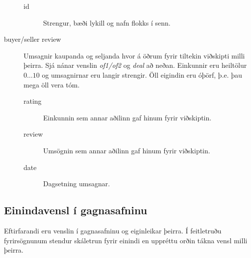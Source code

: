 \documentclass[a4paper,icelandic]{article}
\theoremstyle{definition} \newtheorem{skilgr}{Skilgreining}
\theoremstyle{plain}      \newtheorem{setn}{Setning}
\theoremstyle{remark}     \newtheorem*{lausn}{Lausn}
\begin{document}
\begin{description}
\begin{description}
            \item[id] Strengur, bæði lykill og nafn flokks í senn.
        \end{description}
    \item[buyer/seller review] Umsagnir kaupanda og seljanda hvor á öðrum fyrir
        tiltekin viðskipti milli þeirra. Sjá nánar venslin \emph{of1/of2} og
        \emph{deal} að neðan. Einkunnir eru heiltölur $0\dots 10$ og umsagnirnar
        eru langir strengir. Öll eigindin eru óþörf, þ.e. þau mega öll vera tóm.
        \begin{description}
            \item[rating] Einkunnin sem annar aðilinn gaf hinum fyrir
                viðskiptin.
            \item[review] Umsögnin sem annar aðilinn gaf hinum fyrir
                viðskiptin.
            \item[date] Dagsetning umsagnar.
        \end{description}
\end{description}

\subsection{Einindavensl í gagnasafninu}

Eftirfarandi eru venslin í gagnasafninu og eiginleikar þeirra. Í feitletruðu
fyrirsögnunum stendur skáletrun fyrir einindi en uppréttu orðin tákna vensl
milli þeirra.
\end{document}
